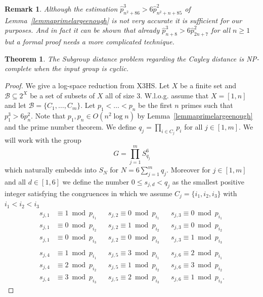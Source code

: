 \documentclass{article}
\newtheorem{theorem}{Theorem}
\newtheorem{remark}{Remark}
\begin{document}
\begin{remark}
Although the estimation $\hat{p}_{n^2+86}^3 > 6\hat{p}_{n^2+n+85}^2$ of Lemma~\ref{lemmaprimelargeenough} is not very accurate it is sufficient for our purposes. And in fact it can be shown that already $\hat{p}_{n+8}^3 > 6\hat{p}_{2n+7}^2$ for all $n \geq 1$ but a formal proof needs a more complicated technique.
\end{remark}

\begin{theorem}
The {\sc Subgroup distance problem} regarding the Cayley distance is {\sf NP}-complete when the input group is cyclic.
\end{theorem}
\begin{proof}
We give a log-space reduction from \textsf{X3HS}. Let $X$ be a finite set and $\mathcal{B} \subseteq 2^X$ be a set of subsets of $X$ all of size $3$. W.l.o.g. assume that $X = [1,n]$ and let $\mathcal{B} = \{C_1,\dots,C_m\}$. Let $p_1 < \dots < p_n$ be the first $n$ primes such that $p_1^3 > 6p_n^2$. Note that $p_1,p_n \in O(n^2 \log n)$ by Lemma~\ref{lemmaprimelargeenough} and the prime number theorem. We define $q_j = \prod_{i \in C_j} p_i$ for all $j \in [1,m]$. We will work with the group
\begin{displaymath}
G = \prod_{j=1}^m S_{q_j}^6
\end{displaymath}
which naturally embedds into $S_N$ for $N = 6\sum_{j=1}^m q_j$. Moreover for $j \in [1,m]$ and all $d \in [1,6]$ we define the number $0 \leq s_{j,d} < q_j$ as the smallest positive integer satisfying the congruences in which we assume $C_j = \{i_1,i_2,i_3\}$ with $i_1 < i_2 < i_3$
\begin{align*}
s_{j,1}&\equiv 1 \bmod p_{i_1} && s_{j,2} \equiv 0 \bmod p_{i_1} && s_{j,3} \equiv 0 \bmod p_{i_1}\\
s_{j,1}&\equiv 0 \bmod p_{i_2} && s_{j,2} \equiv 1 \bmod p_{i_2} && s_{j,3} \equiv 0 \bmod p_{i_2}\\
s_{j,1}&\equiv 0 \bmod p_{i_3} && s_{j,2} \equiv 0 \bmod p_{i_3} && s_{j,3} \equiv 1 \bmod p_{i_3}\\
\\[3mm]
s_{j,4}&\equiv 1 \bmod p_{i_1} && s_{j,5} \equiv 3 \bmod p_{i_1} && s_{j,6} \equiv 2 \bmod p_{i_1}\\
s_{j,4}&\equiv 2 \bmod p_{i_2} && s_{j,5} \equiv 1 \bmod p_{i_2} && s_{j,6} \equiv 3 \bmod p_{i_2}\\
s_{j,4}&\equiv 3 \bmod p_{i_3} && s_{j,5} \equiv 2 \bmod p_{i_3} && s_{j,6} \equiv 1 \bmod p_{i_3}.
\end{align*}

\end{proof}
\end{document}
